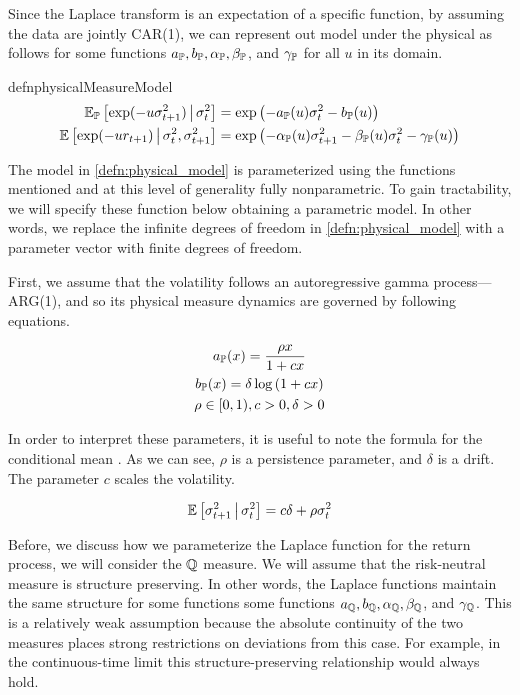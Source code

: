 \documentclass[11pt, letterpaper, twoside, final]{article}
\begin{document}
Since the Laplace transform is an expectation of a specific function, by assuming the data are jointly CAR(1), we
can represent out model under the physical  as follows for some functions $a_{\mathbb{P}}, b_{\mathbb{P}}, \alpha_{\mathbb{P}},
    \beta_{\mathbb{P}}$, and $\gamma_{\mathbb{P}}$ for all $u$ in its domain.

\begin{restatable}{defn}{physicalMeasureModel}
    \label{defn:physical_model}
    \begin{align}
        \operatorname{\mathbb{E}}_{\mathbb{P}} \left[\exp(-u \sigma^2_{t+1}) \,\middle\vert\, \sigma^2_t\right] &= \exp\left( - a_{\mathbb{P}}(u)
            \sigma^2_{t} - b_{\mathbb{P}}(u) \right) \\
        \operatorname{\mathbb{E}}\left[\exp(-u r_{t+1}) \,\middle\vert\, \sigma^2_{t},  \sigma^2_{t+1}\right] &= \exp\left(- \alpha_{\mathbb{P}}(u)
        \sigma^2_{t+1} - \beta_{\mathbb{P}}(u)\sigma^2_{t} - \gamma_{\mathbb{P}}(u) \right) 
    \end{align}
\end{restatable}

The model in \cref{defn:physical_model} is parameterized using the functions mentioned and at this level of
generality fully nonparametric. 
To gain tractability, we will specify these function below obtaining a parametric model.
In other words, we replace the infinite degrees of freedom in \cref{defn:physical_model} with a parameter vector
with finite degrees of freedom.

First, we assume that the volatility follows an autoregressive gamma process---ARG(1), and so its physical measure
dynamics are governed by following equations.

\begin{gather}
    a_{\mathbb{P}}(x) = \frac{\rho x}{1 + c x}  \\
    b_{\mathbb{P}}(x) = \delta \log \left(1 + c x\right) \\
    \rho \in [0, 1), c > 0, \delta > 0 
\end{gather}

In order to interpret these parameters, it is useful to note the formula for the conditional mean
\parencite[8]{khrapov2016affine}.
As we can see, $\rho$ is a persistence parameter, and $\delta$ is a drift.
The parameter $c$ scales the volatility.

\begin{equation}
    \operatorname{\mathbb{E}}\left[\sigma^2_{t+1} \,\middle\vert\, \sigma^2_t\right] = c \delta + \rho \sigma^2_t
\end{equation}

Before, we discuss how we parameterize the Laplace function for the return process, we will consider the $\mathbb{Q}$
measure.
We will assume that the risk-neutral measure is structure preserving.
In other words, the Laplace functions maintain the same structure for some functions some functions $a_{\mathbb{Q}},
b_{\mathbb{Q}}, \alpha_{\mathbb{Q}}, \beta_{\mathbb{Q}}$, and $\gamma_{\mathbb{Q}}$.
This is a relatively weak assumption because the absolute continuity of the two measures places strong
restrictions on deviations from this case.
For example, in the continuous-time limit this structure-preserving relationship would always hold.
\end{document}
